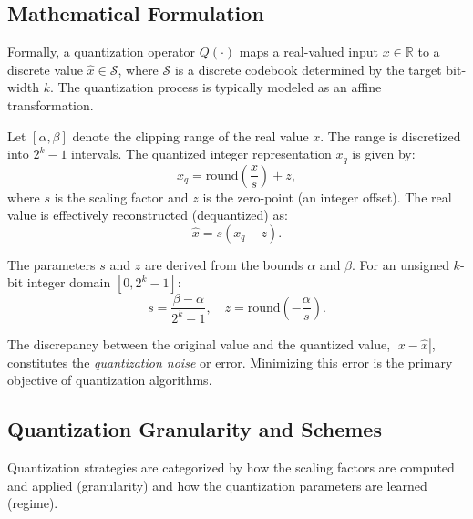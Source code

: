 \subsection{Mathematical Formulation}

Formally, a quantization operator $Q(\cdot)$ maps a real-valued input $x \in \mathbb{R}$ to a discrete value $\hat{x} \in \mathcal{S}$, where $\mathcal{S}$ is a discrete codebook determined by the target bit-width $k$. The quantization process is typically modeled as an affine transformation.

Let $[\alpha, \beta]$ denote the clipping range of the real value $x$. The range is discretized into $2^k - 1$ intervals. The quantized integer representation $x_q$ is given by:
\begin{equation}
    x_q = \text{round}\left( \frac{x}{s} \right) + z,
\end{equation}
where $s$ is the scaling factor and $z$ is the zero-point (an integer offset). The real value is effectively reconstructed (dequantized) as:
\begin{equation}
    \hat{x} = s(x_q - z).
    \label{eq:quant_affine}
\end{equation}

The parameters $s$ and $z$ are derived from the bounds $\alpha$ and $\beta$. For an unsigned $k$-bit integer domain $[0, 2^k - 1]$:
\begin{equation}
    s = \frac{\beta - \alpha}{2^k - 1}, \quad z = \text{round}\left( -\frac{\alpha}{s} \right).
\end{equation}

The discrepancy between the original value and the quantized value, $|x - \hat{x}|$, constitutes the \emph{quantization noise} or error. Minimizing this error is the primary objective of quantization algorithms.

\subsection{Quantization Granularity and Schemes}

Quantization strategies are categorized by how the scaling factors are computed and applied (granularity) and how the quantization parameters are learned (regime).

